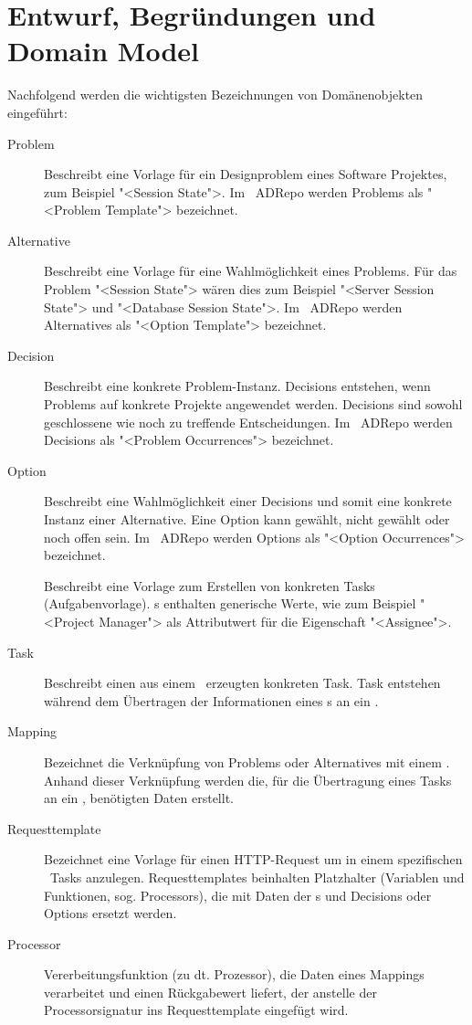 	\section{Entwurf, Begründungen und Domain Model}
		Nachfolgend werden die wichtigsten Bezeichnungen von Domänenobjekten eingeführt:
		
		\begin{description}
			\item[Problem] Beschreibt eine Vorlage für ein Designproblem eines Software Projektes, 
				zum Beispiel "<Session State">. 
				Im \dks\ ADRepo werden Problems als "<Problem Template"> bezeichnet.
			\item[Alternative] Beschreibt eine Vorlage für eine Wahlmöglichkeit eines Problems.
				Für das Problem "<Session State"> wären dies zum Beispiel "<Server Session State"> und 	"<Database Session State">. 
				Im \dks\ ADRepo werden Alternatives als "<Option Template"> bezeichnet.
			\item[Decision] Beschreibt eine konkrete Problem-Instanz.
				Decisions entstehen, wenn Problems auf konkrete Projekte angewendet werden.
				Decisions sind sowohl geschlossene wie noch zu treffende Entscheidungen.
				Im \dks\ ADRepo werden Decisions als "<Problem Occurrences"> bezeichnet.
			\item[Option] Beschreibt eine Wahlmöglichkeit einer Decisions 
				und somit eine konkrete Instanz einer Alternative.
				Eine Option kann gewählt, nicht gewählt oder noch offen sein.
				Im \dks\ ADRepo werden Options als "<Option Occurrences"> bezeichnet.
			\item[\ttpl] Beschreibt eine Vorlage zum Erstellen von konkreten Tasks (Aufgabenvorlage).
				\ttpl s enthalten generische Werte, wie zum Beispiel "<Project Manager"> als
				Attributwert für die Eigenschaft "<Assignee">.
			\item[Task] Beschreibt einen aus einem \ttpl\ erzeugten konkreten Task.
				Task entstehen während dem Übertragen der Informationen eines \ttpl s an ein \ppt.
			\item[Mapping] Bezeichnet die Verknüpfung von Problems oder Alternatives mit einem \ttpl. 
				Anhand dieser Verknüpfung werden die, für die Übertragung eines Tasks an ein \ppt, benötigten Daten erstellt.
			\item[Requesttemplate] Bezeichnet eine Vorlage für einen HTTP-Request um 
				in einem spezifischen \ppt\ Tasks anzulegen.
				Requesttemplates beinhalten Platzhalter (Variablen und Funktionen, sog. Processors),
				die mit Daten der \ttpl s und Decisions oder Options ersetzt werden. 
			\item[Processor] Vererbeitungsfunktion (zu dt. Prozessor), 
				die Daten eines Mappings verarbeitet und einen Rückgabewert liefert, 
				der anstelle der Processorsignatur ins Requesttemplate eingefügt wird.
		\end{description}	
	
